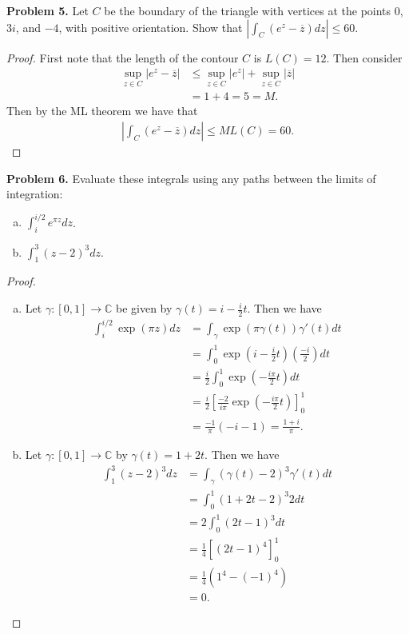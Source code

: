 \documentclass[leqno]{article}
\theoremstyle{nonumberplain}
\newtheorem{proof}{Proof}
\newcommand{\C}{\mathbb{C}}
\begin{document}
\vspace*{1cm}

\noindent\textbf{Problem 5.}  Let $C$ be the boundary of the triangle with vertices at the points 0, $3i$, and $-4$, with positive orientation. Show that $\left| \int_C (e^z - \overline{z}) dz \right| \leq 60$.

\begin{proof}
First note that the length of the contour $C$ is $L(C)=12$.  Then consider
\begin{align*}
\sup_{z\in C} |e^z - \overline{z}|&\leq \sup_{z\in C} |e^z|+\sup_{z\in C} |\overline{z}|\\
&=1+4=5=M.
\end{align*}
Then by the ML theorem we have that
\begin{align*}
\left| \int_C (e^z-\overline{z})dz \right| \leq ML(C)=60.
\end{align*}
\end{proof}

\vspace*{1cm}

\noindent\textbf{Problem 6.} Evaluate these integrals using any paths between the limits of integration:
\begin{enumerate}[(a)]
\item $\int_i^{i/2} e^{\pi z} dz$.
\item $\int_1^3 (z-2)^3 dz$.
\end{enumerate} 


\begin{proof}~
\begin{enumerate}[(a)]
\item Let $\gamma \colon [0,1] \to \C$ be given by $\gamma(t)=i-\frac{i}{2}t$.  Then we have
\begin{align*}
\int_i^{i/2} \exp(\pi z) dz  &= \int_\gamma \exp(\pi \gamma(t))\gamma'(t)dt\\
&= \int_0^1 \exp\left( i -\frac{i}{2}t \right)\left(\frac{-i}{2}\right) dt\\
&= \frac{i}{2} \int_0^1 \exp\left( -\frac{i\pi}{2}t\right) dt\\
&= \frac{i}{2} \left[ \frac{-2}{i\pi} \exp\left( -\frac{i\pi}{2}t \right) \right]_0^1\\
&= \frac{-1}{\pi} (-i-1)=\frac{1+i}{\pi}.
\end{align*}
\item Let $\gamma \colon [0,1] \to \C$ by $\gamma(t)=1+2t$. Then we have
\begin{align*}
\int_1^3 (z-2)^3dz &= \int_\gamma (\gamma(t)-2)^3\gamma'(t)dt\\
&= \int_0^1 (1+2t-2)^3 2dt\\
&= 2 \int_0^1 (2t-1)^3 dt\\
&= \frac{1}{4} \left[(2t-1)^4\right]_0^1\\
&= \frac{1}{4} (1^4-(-1)^4)\\
&= 0.
\end{align*}
\end{enumerate}
\end{proof}
\end{document}
